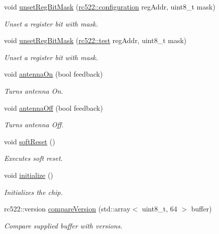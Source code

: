 \begin{DoxyCompactItemize}
void \hyperlink{classrc522_a1ebf4ec7b5342e683310f526a1f10ede}{unset\+Reg\+Bit\+Mask} (\hyperlink{classrc522_afcf27c8198d017cd4e8173c7d7a6fded}{rc522\+::configuration} reg\+Addr, uint8\+\_\+t mask)
\begin{DoxyCompactList}\small\item\em Unset a register bit with mask. \end{DoxyCompactList}\item 
void \hyperlink{classrc522_a52f345b15adb65750491a0bc4ccc7513}{unset\+Reg\+Bit\+Mask} (\hyperlink{classrc522_a9589917c9bbcd18ea9c7d86c7ec565bd}{rc522\+::test} reg\+Addr, uint8\+\_\+t mask)
\begin{DoxyCompactList}\small\item\em Unset a register bit with mask. \end{DoxyCompactList}\item 
void \hyperlink{classrc522_a9f2477eaf7d1f2f3123714cce6311d62}{antenna\+On} (bool feedback)
\begin{DoxyCompactList}\small\item\em Turns antenna On. \end{DoxyCompactList}\item 
void \hyperlink{classrc522_a3318612b0a93b415415ef9e1a6b03dae}{antenna\+Off} (bool feedback)
\begin{DoxyCompactList}\small\item\em Turns antenna Off. \end{DoxyCompactList}\item 
void \hyperlink{classrc522_a60bfe75989ff8f654d412d7802993a53}{soft\+Reset} ()
\begin{DoxyCompactList}\small\item\em Executes soft reset. \end{DoxyCompactList}\item 
void \hyperlink{classrc522_a49a6b70c2d43ae0d22c608025ac55dec}{initialize} ()
\begin{DoxyCompactList}\small\item\em Initializes the chip. \end{DoxyCompactList}\item 
rc522\+::version \hyperlink{classrc522_a144c7bf4db9385aaa345c40f36ec929c}{compare\+Version} (std\+::array$<$ uint8\+\_\+t, 64 $>$ buffer)
\begin{DoxyCompactList}\small\item\em Compare supplied buffer with versions. \end{DoxyCompactList}\item 

\end{DoxyCompactItemize}
